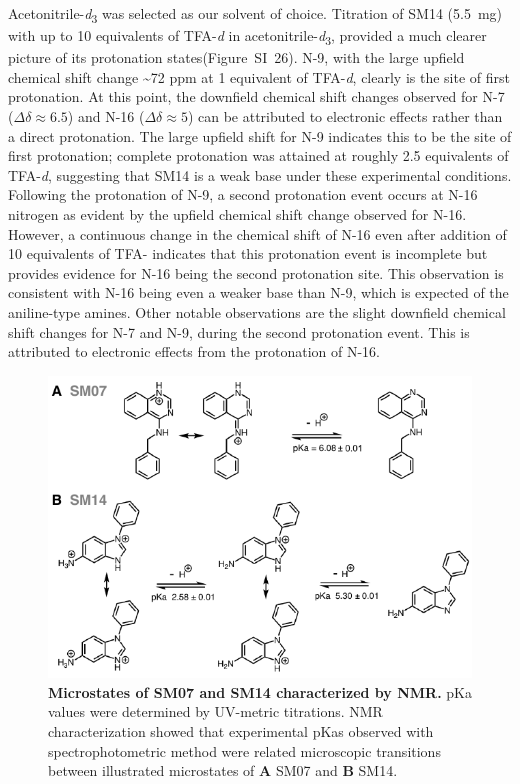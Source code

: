 \documentclass[9pt,lineno]{elife}
\begin{document}
Acetonitrile-\textit{d}\textsubscript{3} was selected as our solvent of choice. Titration of SM14 (5.5~mg) with up to 10 equivalents of TFA-\textit{d} in acetonitrile-\textit{d}\textsubscript{3}, provided a much clearer picture of its protonation states(Figure~SI~26). N-9, with the large upfield chemical shift change \textasciitilde72 ppm at 1 equivalent of TFA-\textit{d}, clearly is the site of first protonation. At this point, the downfield chemical shift changes observed for N-7 ($\Delta\delta \approx 6.5$) and N-16 ($\Delta\delta \approx 5$) can be attributed to electronic effects rather than a direct protonation. The large upfield shift for N-9 indicates this to be the site of first protonation; complete protonation was attained at roughly 2.5 equivalents of TFA-\textit{d}, suggesting that SM14 is a weak base under these experimental conditions. Following the protonation of N-9, a second protonation event occurs at N-16 nitrogen as evident by the upfield chemical shift change observed for N-16. However, a continuous change in the chemical shift of N-16 even after addition of 10 equivalents of TFA- indicates that this protonation event is incomplete but provides evidence for N-16 being the second protonation site. This observation is consistent with N-16 being even a weaker base than N-9, which is expected of the aniline-type amines. Other notable observations are the slight downfield chemical shift changes for N-7 and N-9, during the second protonation event. This is attributed to electronic effects from the protonation of N-16.

\begin{figure}
\begin{center}
\includegraphics[width=0.75\linewidth]{figures/NMR_microstates_figure.pdf}
\caption{{\bf Microstates of SM07 and SM14 characterized by NMR.} pKa values were determined by UV-metric titrations. NMR characterization showed that experimental pKas observed with spectrophotometric method were related microscopic transitions between illustrated microstates of \textbf{A} SM07 and \textbf{B} SM14. 
}
\label{fig:NMR_microstates}
\end{center}
\end{figure}
\end{document}
